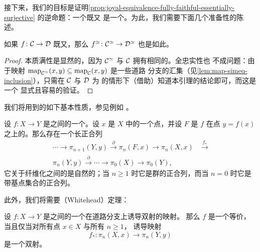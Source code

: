 接下来，我们的目标是证明\cref{prop:joyal-equivalence-fully-faithful-essentially-surjective} 的逆命题：一个既\trFullyFaithful{}又\trEssentiallySurjective{}%
\trFunctor{}是一个\trJoyalEquivalence{}。为此，我们需要下面几个准备性的陈述。

\begin{lemma}\label{lem:core-fully-faithful-essentially-surjective}
如果 $f\colon \mathcal{C} \to \mathcal{D}$ 既\trFullyFaithful{}又\trEssentiallySurjective{}，那么
$f^{\simeq}\colon \mathcal{C}^{\simeq} \to \mathcal{D}^{\simeq}$ 也是如此。
\end{lemma}

\begin{proof}
本质满性是显然的，因为 $\mathcal{C}^{\simeq}$ 与 $\mathcal{C}$ 拥有相同的\trObject{}。全忠实性也
不成问题：由于映射
$\mathrm{map}_{\mathcal{C}^{\simeq}}(x, y) \subseteq \mathrm{map}_{\mathcal{C}}(x, y)$ 是一些道路
分支的汇集（见\cref{lem:map-simeq-inclusion}），只需在 $\mathcal{C}$ 与 $\mathcal{D}$ 为%
\trOrdinaryCategory{}的情形下（借助\trHomotopyCategory{}）知道本引理的结论即可，而这是一个
显式且容易的验证。
\end{proof}

我们将用到\trKanFibration{}的如下基本性质，参见例如
\cite[Lemma 7.3]{GJ09}。

\begin{lemma}\label{lem:kan-fibration-long-exact-sequence}
设 $f\colon X \to Y$ 是\trKanComplex{}之间的一个\trKanFibration{}。设 $x$ 是 $X$
中的一个点，并设 $F$ 是 $f$ 在点 $y = f(x)$ 之上的\trFibre{}。那么存在一个长正合列
\[
\begin{aligned}
\dotsb \longrightarrow \pi_{n+1}(Y, y) \xrightarrow{\ \partial\ }
\pi_n(F, x) \longrightarrow \pi_n(X, x)\; &\xrightarrow{\ f_*\ }\\
\pi_n(Y, y) \xrightarrow{\ \partial\ } \dotsb
\longrightarrow \pi_0(X) \longrightarrow \pi_0(Y),
\end{aligned}
\]
它关于纤维化之间的\trMorphism{}是自然的；当 $n \ge 1$ 时它是群的正合列，而当
$n = 0$ 时它是带基点集合的正合列。
\end{lemma}

此外，我们将需要\trWhitehead{}（Whitehead）定理：

\begin{proposition}\label{prop:whitehead}
设 $f\colon X \to Y$ 是\trKanComplex{}之间的一个在道路分支上诱导双射的映射。
那么 $f$ 是一个\trHomotopy{}等价，当且仅当对所有点 $x \in X$ 与所有 $n \ge 1$，
诱导映射
\[
f_*\colon \pi_n(X, x) \longrightarrow \pi_n(Y, y)
\]
是一个双射。
\end{proposition}

